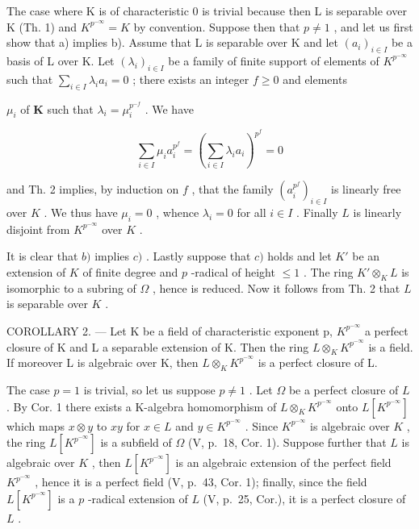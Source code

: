 The case where K is of characteristic 0 is trivial because then L is separable over K (Th. 1) and \(K^{p^{-\infty}} = K\) by convention. Suppose then that \(p \neq 1\) , and let us first show that a) implies b). Assume that L is separable over K and let \((a_i)_{i \in I}\) be a basis of L over K. Let \((\lambda_i)_{i \in I}\) be a family of finite support of elements of \(K^{p^{-\infty}}\) such that \(\sum_{i \in I} \lambda_i a_i = 0\) ; there exists an integer \(f \geqslant 0\) and elements

\(\mu_{i}\) of \(\mathbf{K}\) such that \(\lambda_{i} = \mu_{i}^{p^{-f}}\) . We have

\[
\sum_ {i \in I} \mu_ {i} a _ {i} ^ {p ^ {f}} = \left(\sum_ {i \in I} \lambda_ {i} a _ {i}\right) ^ {p ^ {f}} = 0
\]

and Th. 2 implies, by induction on \(f\) , that the family \((a_i^{p^f})_{i\in I}\) is linearly free over \(K\) . We thus have \(\mu_i = 0\) , whence \(\lambda_i = 0\) for all \(i\in I\) . Finally \(L\) is linearly disjoint from \(K^{p^{-\infty}}\) over \(K\) .

It is clear that \(b)\) implies \(c)\) . Lastly suppose that \(c)\) holds and let \(K'\) be an extension of \(K\) of finite degree and \(p\) -radical of height \(\leqslant 1\) . The ring \(K' \otimes_K L\) is isomorphic to a subring of \(\Omega\) , hence is reduced. Now it follows from Th. 2 that \(L\) is separable over \(K\) .

COROLLARY 2. --- Let K be a field of characteristic exponent p, \(K^{p^{-\infty}}\) a perfect closure of K and L a separable extension of K. Then the ring \(L \otimes_{K} K^{p^{-\infty}}\) is a field. If moreover L is algebraic over K, then \(L \otimes_{K} K^{p^{-\infty}}\) is a perfect closure of L.

The case \(p = 1\) is trivial, so let us suppose \(p \neq 1\) . Let \(\Omega\) be a perfect closure of \(L\) . By Cor. 1 there exists a K-algebra homomorphism of \(L \otimes_K K^{p^{-\infty}}\) onto \(L[K^{p^{-\infty}}]\) which maps \(x \otimes y\) to \(xy\) for \(x \in L\) and \(y \in K^{p^{-\infty}}\) . Since \(K^{p^{-\infty}}\) is algebraic over \(K\) , the ring \(L[K^{p^{-\infty}}]\) is a subfield of \(\Omega\) (V, p.~18, Cor. 1). Suppose further that \(L\) is algebraic over \(K\) , then \(L[K^{p^{-\infty}}]\) is an algebraic extension of the perfect field \(K^{p^{-\infty}}\) , hence it is a perfect field (V, p.~43, Cor. 1); finally, since the field \(L[K^{p^{-\infty}}]\) is a \(p\) -radical extension of \(L\) (V, p.~25, Cor.), it is a perfect closure of \(L\) .

